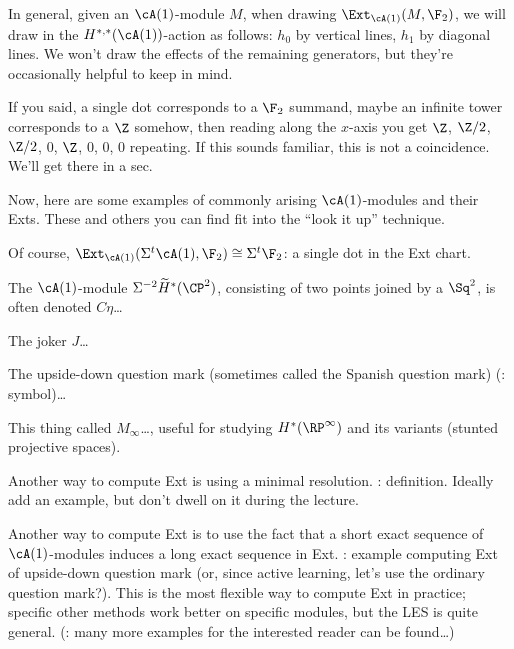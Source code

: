 In general, given an $\cA(1)$-module $M$, when drawing $\Ext_{\cA(1)}(M, \F_2)$, we will draw in the
$H^{*,*}(\cA(1))$-action as follows: $h_0$ by vertical lines, $h_1$ by diagonal lines. We won't draw the effects of
the remaining generators, but they're occasionally helpful to keep in mind.
\begin{rem}
If you said, a single dot corresponds to a $\F_2$ summand, maybe an infinite tower corresponds to a $\Z$ somehow,
then reading along the $x$-axis you get $\Z$, $\Z/2$, $\Z/2$, $0$, $\Z$, $0$, $0$, $0$ repeating. If this sounds
familiar, this is not a coincidence. We'll get there in a sec.
\end{rem}
Now, here are some examples of commonly arising $\cA(1)$-modules and their Exts. These and others you can find fit
into the ``look it up'' technique.
\begin{exm}
Of course, $\Ext_{\cA(1)}(\Sigma^t\cA(1), \F_2)\cong \Sigma^t\F_2$: a single dot in the Ext chart.
\end{exm}
\begin{exm}
The $\cA(1)$-module $\Sigma^{-2}\widetilde H^*(\CP^2)$, consisting of two points joined by a $\Sq^2$, is often
denoted $C\eta$\dots
\end{exm}
\begin{exm}
The joker $J$\dots
\end{exm}
\begin{exm}
The upside-down question mark (sometimes called the Spanish question mark) (\TODO: symbol)\dots
\end{exm}
\begin{exm}
This thing called $M_\infty$\dots, useful for studying $H^*(\RP^\infty)$ and its variants (stunted projective
spaces).
\end{exm}

Another way to compute Ext is using a minimal resolution.
\TODO: definition. Ideally add an example, but don't dwell on it during the lecture.


Another way to compute Ext is to use the fact that a short exact sequence of $\cA(1)$-modules induces a long exact
sequence in Ext. \TODO: example computing Ext of upside-down question mark (or, since active learning, let's use
the ordinary question mark?). This is the most flexible way to compute Ext in practice; specific other methods work
better on specific modules, but the LES is quite general. (\TODO: many more examples for the interested reader can
be found\dots)

